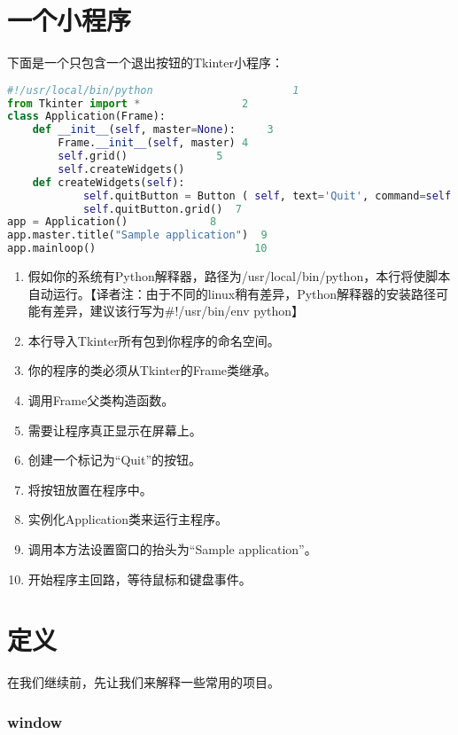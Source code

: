 \documentclass[11pt,a4paper,oneside]{book}
\begin{document}
\chapter[一个小程序]{一个小程序}%
下面是一个只包含一个退出按钮的Tkinter小程序：
\begin{lstlisting}[language=python]
#!/usr/local/bin/python                      1
from Tkinter import * 			     2
class Application(Frame): 			
	def __init__(self, master=None):     3
		Frame.__init__(self, master) 4
		self.grid() 		     5	
		self.createWidgets() 
	def createWidgets(self): 
			self.quitButton = Button ( self, text='Quit', command=self.quit ) 6	
			self.quitButton.grid()  7
app = Application() 			8			
app.master.title("Sample application") 	9
app.mainloop()                         10
\end{lstlisting}
\begin{enumerate}
\item 假如你的系统有Python解释器，路径为/usr/local/bin/python，本行将使脚本自动运行。【译者注：由于不同的linux稍有差异，Python解释器的安装路径可能有差异，建议该行写为\#!/usr/bin/env python】
\item 本行导入Tkinter所有包到你程序的命名空间。
\item 你的程序的类必须从Tkinter的Frame类继承。
\item 调用Frame父类构造函数。
\item 需要让程序真正显示在屏幕上。
\item 创建一个标记为“Quit”的按钮。
\item 将按钮放置在程序中。
\item 实例化Application类来运行主程序。
\item 调用本方法设置窗口的抬头为“Sample application”。
\item 开始程序主回路，等待鼠标和键盘事件。
\end{enumerate}
\chapter[定义]{定义}%
在我们继续前，先让我们来解释一些常用的项目。
\subsection*{\textbf{window}}
\end{document}
